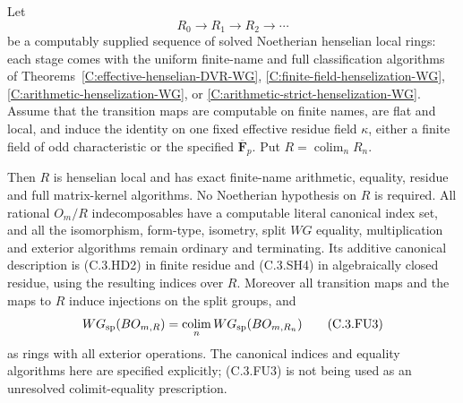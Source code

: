 \begin{theorem}
\label{C:effective-henselian-flat-unions}
Let
\[
 R_0\longrightarrow R_1\longrightarrow R_2\longrightarrow\cdots
\]
be a computably supplied sequence of solved Noetherian
henselian local rings: each stage comes with the
uniform finite-name and full classification algorithms
of Theorems~\ref{C:effective-henselian-DVR-WG},
\ref{C:finite-field-henselization-WG},
\ref{C:arithmetic-henselization-WG}, or
\ref{C:arithmetic-strict-henselization-WG}.
Assume that the transition maps are computable on
finite names, are flat and local, and induce the
identity on one fixed effective residue field
$\kappa$, either a finite field of odd characteristic
or the specified $\overline{\mathbf F}_p$.
Put $R=\operatorname*{colim}_nR_n$.

Then $R$ is henselian local and has exact finite-name
arithmetic, equality, residue and full matrix-kernel
algorithms.  No Noetherian hypothesis on $R$ is required.
All rational $O_m/R$ indecomposables have a computable
literal canonical index set, and all the isomorphism,
form-type, isometry, split $WG$ equality, multiplication
and exterior algorithms remain ordinary and terminating.
Its additive canonical description is (C.3.HD2) in
finite residue and (C.3.SH4) in algebraically closed
residue, using the resulting indices over $R$.
Moreover all transition maps and the maps to $R$ induce
injections on the split groups, and
\[
 WG_{\rm sp}(BO_{m,R})
       =\operatorname*{colim}_n WG_{\rm sp}(BO_{m,R_n})    \tag{C.3.FU3}
\]
as rings with all exterior operations.
The canonical indices and equality algorithms here are
specified explicitly; (C.3.FU3) is not being used as an
unresolved colimit-equality prescription.
\end{theorem}
